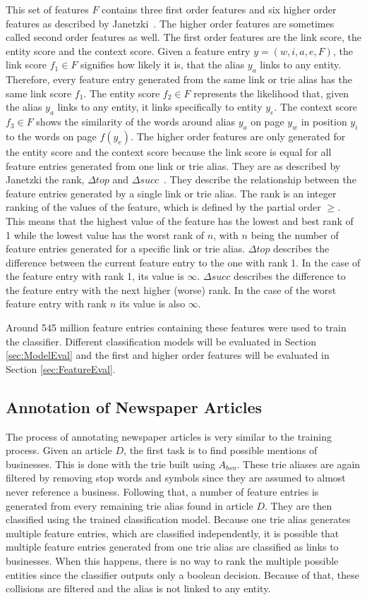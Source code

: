 This set of features $F$ contains three first order features and six higher order features as described by Janetzki\ \cite{janetzki}. The higher order features are sometimes called second order features as well. The first order features are the link score, the entity score and the context score. Given a feature entry $y = (w,i,a,e,F)$, the link score $f_1 \in F$ signifies how likely it is, that the alias $y_a$ links to any entity. Therefore, every feature entry generated from the same link or trie alias has the same link score $f_1$. The entity score $f_2 \in F$ represents the likelihood that, given the alias $y_a$ links to any entity, it links specifically to entity $y_e$. The context score $f_3 \in F$ shows the similarity of the words around alias $y_a$ on page $y_w$ in position $y_i$ to the words on page $f(y_e)$. The higher order features are only generated for the entity score and the context score because the link score is equal for all feature entries generated from one link or trie alias. They are as described by Janetzki the rank, $\Delta top$ and $\Delta succ$\ \cite{janetzki}. They describe the relationship between the feature entries generated by a single link or trie alias. The rank is an integer ranking of the values of the feature, which is defined by the partial order $\geq$. This means that the highest value of the feature has the lowest and best rank of 1 while the lowest value has the worst rank of $n$, with $n$ being the number of feature entries generated for a specific link or trie alias. $\Delta top$ describes the difference between the current feature entry to the one with rank 1. In the case of the feature entry with rank 1, its value is $\infty$. $\Delta succ$ describes the difference to the feature entry with the next higher (worse) rank. In the case of the worst feature entry with rank $n$ its value is also $\infty$.\par
Around 545 million feature entries containing these features were used to train the classifier. Different classification models will be evaluated in Section \ref{sec:ModelEval} and the first and higher order features will be evaluated in Section \ref{sec:FeatureEval}.

\subsection{Annotation of Newspaper Articles}
The process of annotating newspaper articles is very similar to the training process. Given an article $D$, the first task is to find possible mentions of businesses. This is done with the trie built using $A_{bsn}$. These trie aliases are again filtered by removing stop words and symbols since they are assumed to almost never reference a business. Following that, a number of feature entries is generated from every remaining trie alias found in article $D$. They are then classified using the trained classification model. Because one trie alias generates multiple feature entries, which are classified independently, it is possible that multiple feature entries generated from one trie alias are classified as links to businesses. When this happens, there is no way to rank the multiple possible entities since the classifier outputs only a boolean decision. Because of that, these collisions are filtered and the alias is not linked to any entity.
